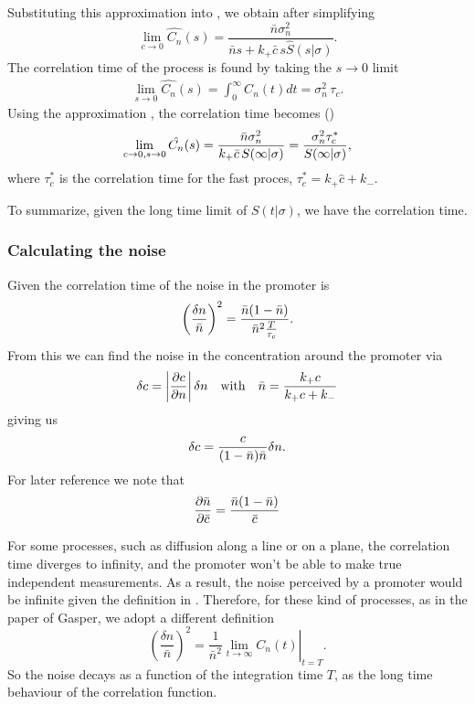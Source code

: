 Substituting this approximation into , we obtain after simplifying
\begin{equation}
 \lim_{c \rightarrow 0} \hat{C_n}(s) = \frac{\bar{n} \sigma_n^2}{\bar{n} s + k_+ \bar{c} \, s \hat{S}(s|\sigma)}.
\end{equation}
The correlation time of the process is found by taking the $s \rightarrow 0$ limit
\begin{eqnarray}
 \lim_{s \rightarrow 0} \hat{C_n}(s) = \int_0^\infty C_n(t) dt = \sigma_n^2 \, \tau_c.
\end{eqnarray}
Using the approximation , the correlation time becomes ()
\begin{equation}
 \lim_{c \rightarrow 0, s \rightarrow 0} \hat{C_n}(s) = \frac{\bar{n} \sigma_n^2}{k_+ \bar{c} \, S(\infty|\sigma)} = \frac{\sigma_n^2 \tau_c^*}{S(\infty|\sigma)},
 \elabel{CT1}
\end{equation}
where $\tau_c^*$ is the correlation time for the fast proces, $\tau_c^* = k_+ \hat{c} + k_-$.

To summarize, given the long time limit of $S(t|\sigma)$, we have the correlation time.

\subsubsection{Calculating the noise}
Given the correlation time of the noise in the promoter is
\begin{equation}
 \left( \frac{\delta n}{\bar{n}} \right)^2 = \frac{\bar{n}(1-\bar{n})}{\bar{n}^2\frac{T}{\tau_c}}.
 \elabel{EqProNoise}
\end{equation}
From this we can find the noise in the concentration around the promoter via
\begin{equation}
 \delta c = \left|\frac{\partial c}{\partial n}\right| \delta n \quad {\rm with} \quad \bar{n} = \frac{k_+ c}{k_+ c + k_-}
\end{equation}
giving us
\begin{equation}
 \delta c = \frac{c}{(1-\bar{n})\bar{n}}\delta n.
 \elabel{EqConNoise}
\end{equation}
For later reference we note that
\begin{equation}
 \frac{\partial \bar{n}}{\partial \bar{c}} = \frac{\bar{n}(1-\bar{n})}{\bar{c}}
 \elabel{EqProNoiseII}
\end{equation}

For some processes, such as diffusion along a line or on a plane, the correlation time diverges to infinity, and the promoter won't be able to make true independent measurements. As a result, the noise perceived by a promoter would be infinite given the definition in . Therefore, for these kind of processes, as in the paper of Gasper, we adopt a different definition
\begin{equation}
  \left( \frac{\delta n}{\bar{n}} \right)^2 = \left. \frac{1}{\bar{n}^2} \lim_{t \rightarrow \infty} C_n(t)  \right|_{t = T}.
\end{equation}
So the noise decays as a function of the integration time $T$, as the long time behaviour of the correlation function.


